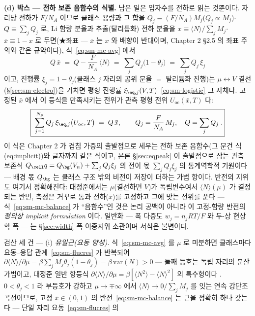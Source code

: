 \textbf{(d) 박스 --- 전하 보존 음함수의 식별.} 남은 일은 입자수를 전하로 읽는 것뿐이다. 자리당 전하가
$F/N_A$ 이므로 클래스 용량과 그 합을 $Q_j\equiv(F/N_A)M_j$($Q_j\propto M_j$)$\cdot$$Q\equiv\sum_jQ_j$ 로,
Li 함량 분율과 추출(탈리튬화) 전하 분율을 $x\equiv\langle N\rangle/\sum_jM_j$$\cdot$$\bar x\equiv1-x$ 로
두면(★좌표 --- $\bar x$ 는 $x$ 와 배향이 반대이며, Chapter 2 §2.5 의 좌표 주의와 같은 규약이다),
식~\eqref{eq:sm-mc-avg} 에서
\[
Q\,\bar x
\;=\;Q-\frac{F}{N_A}\,\langle N\rangle
\;=\;\sum_j Q_j\bigl(1-\theta_j\bigr)
\;=\;\sum_j Q_j\,\xi_j
\]
이고, 진행률 $\xi_j=1-\theta_j$(클래스 $j$ 자리의 공위 분율 $=$ 탈리튬화 진행)는 $\mu\leftrightarrow V$
결선(\S\ref{sec:sm-electro})을 거치면 평형 진행률 $\xi_{\eq,j}(V,T)$~\eqref{eq:sm-logistic} 그 자체다.
고정된 $\bar x$ 에서 이 등식을 만족시키는 전위가 관측 평형 전위 $U_\mathrm{oc}(\bar x,T)$ 다:
\begin{equation}
\boxed{\;\sum_{j=1}^{N_p} Q_j\,\xi_{\eq,j}\bigl(U_\mathrm{oc},T\bigr)\;=\;Q\,\bar x,
\qquad Q_j=\frac{F}{N_A}\,M_j,\quad Q=\sum_jQ_j\;.}
\label{eq:sm-mc-balance}
\end{equation}
이 식은 Chapter 2 가 겹침 가중의 출발점으로 세우는 전하 보존 음함수(그 문건 식 (eq:implicit))와
글자까지 같은 식이고, 본론 \S\ref{sec:eqpeak} 이 출발점으로 삼는 관측 보존식
$Q_\cell q=Q_\bg(V_n)+\sum_jQ_j\xi_j$ 의 전이 몫 $\sum_jQ_j\xi_j$ 의 통계역학적 기원이다 --- 배경 몫
$Q_\bg$ 는 클래스 구조 밖의 비전이 저장이 더하는 가법 항이다. 반전의 지위도 여기서 정확해진다:
대정준에서는 $\mu$(결선하면 $V$)가 독립변수여서 $\langle N\rangle(\mu)$ 가 결정되는 반면, 측정은 거꾸로
통과 전하($\bar x$)를 고정하고 그에 맞는 전위를 푼다 --- 식~\eqref{eq:sm-mc-balance} 가 ``음함수''인
것은 논리 공백이 아니라 이 고정-함량 반전의 \emph{정의상 implicit formulation} 이다. 일반화 --- 폭
다중도 $w_j=n_jRT/F$ 와 두-상 현상학 폭 --- 는 \S\ref{sec:width} 폭 이중지위 소관이며 서식은 불변이다.
\begin{verifybox}
검산 세 건 --- (i) \emph{유일근(요동 양성).} 식~\eqref{eq:sm-mc-avg} 를 $\mu$ 로 미분하면 클래스마다
요동--응답 관계~\eqref{eq:sm-flucres} 가 반복되어
$\partial\langle N\rangle/\partial\mu=\beta\sum_jM_j\theta_j(1-\theta_j)=\beta\,\mathrm{var}(N)>0$ ---
둘째 등호는 독립 자리의 분산 가법이고, 대정준 일반 항등식
$\partial\langle N\rangle/\partial\mu=\beta[\langle N^2\rangle-\langle N\rangle^2]$ 의 특수형이다
\cite{mcquarrie1976}. $0<\theta_j<1$ 라 부등호가 강하고 $\mu\to\mp\infty$ 에서
$\langle N\rangle\to0/\sum_jM_j$ 를 잇는 연속 강단조 곡선이므로, 고정 $\bar x\in(0,1)$ 의
반전~\eqref{eq:sm-mc-balance} 는 근을 정확히 하나 갖는다 --- 단일 자리 요동~\eqref{eq:sm-flucres} 의

\end{verifybox}$$
